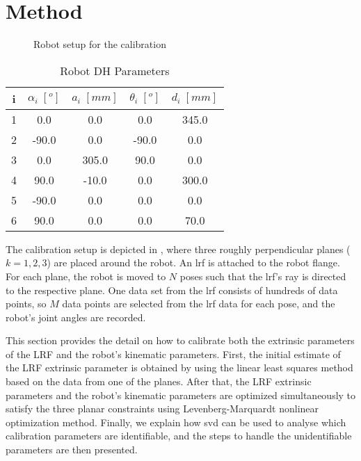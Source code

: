 \section{Method}
\label{sec:method}
\begin{figure}[t]
  \centering
  \vspace*{2mm}
  \caption{Robot setup for the calibration}
  \label{fig:robot_setup}
\end{figure}


\renewcommand{\arraystretch}{1.5}
\begin{table}[htp]
\caption{Robot DH Parameters}
\label{tab:dh_params}
\centering
\begin{tabular}{c c c c c}
\toprule
i &  \textbf{$\alpha_i \;[^o]$} & \textbf{$a_i \;[mm]$} &  \textbf{$\theta_i \;[^o]$}  & \textbf{$d_i \;[mm]$}\\
\midrule
1 & 0.0 & 0.0 & 0.0 & 345.0\\
2 & -90.0 & 0.0 & -90.0 & 0.0\\
3 & 0.0 & 305.0 & 90.0 & 0.0\\
4 & 90.0 & -10.0 & 0.0 & 300.0\\
5 & -90.0 & 0.0 & 0.0 & 0.0\\
6 & 90.0 & 0.0 & 0.0 & 70.0\\
\bottomrule
\end{tabular}
\end{table}

The calibration setup is depicted in , where three roughly perpendicular planes ($k=1,2,3$) are placed around the robot. An \ac{lrf} is attached to the robot flange. For each plane, the robot is moved to $N$ poses such that the \ac{lrf}'s ray is directed to the respective plane. One data set from the \ac{lrf} consists of hundreds of data points, so $M$ data points are selected from the \ac{lrf} data for each pose, and the robot's joint angles are recorded. 

This section provides the detail on how to calibrate both the extrinsic parameters of the LRF and the robot's kinematic parameters. First, the initial estimate of the LRF extrinsic parameter is obtained by using the linear least squares method based on the data from one of the planes. After that, the LRF extrinsic parameters and the robot's kinematic parameters are optimized simultaneously to satisfy the three planar constraints using Levenberg-Marquardt nonlinear optimization method. Finally, we explain how \ac{svd} can be used to analyse which calibration parameters are identifiable, and the steps to handle the unidentifiable parameters are then presented. 
